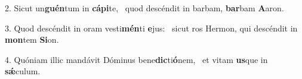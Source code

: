 2. Sicut un\textbf{guén}tum in \textbf{cá}\textbf{pi}te, \ast\  quod descéndit in barbam, \textbf{bar}bam \textbf{A}aron.\

3. Quod descéndit in oram vesti\textbf{mén}ti \textbf{e}jus: \ast\  sicut ros Hermon, qui descéndit in \textbf{mon}tem \textbf{Si}on.\

4. Quóniam illic mandávit Dóminus bene\textbf{dic}ti\textbf{ó}nem, \ast\  et vitam \textbf{us}que in \textbf{sǽ}culum.\

